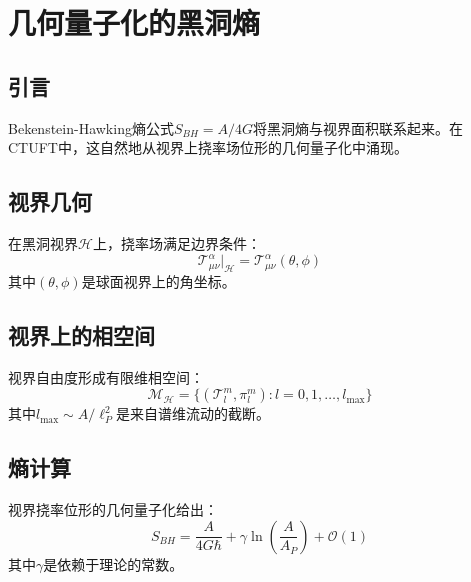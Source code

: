 \section{几何量子化的黑洞熵}
\label{sec:bh_entropy}

\subsection{引言}

Bekenstein-Hawking熵公式$S_{BH} = A/4G$将黑洞熵与视界面积联系起来。在CTUFT中，这自然地从视界上挠率场位形的几何量子化中涌现。

\subsection{视界几何}

\begin{definition}[视界上的挠率场]
在黑洞视界$\mathcal{H}$上，挠率场满足边界条件：
\begin{equation}
    \mathcal{T}^\alpha_{\mu\nu}|_{\mathcal{H}} = \mathcal{T}^\alpha_{\mu\nu}(\theta, \phi)
\end{equation}
其中$(\theta, \phi)$是球面视界上的角坐标。
\end{definition}

\subsection{视界上的相空间}

视界自由度形成有限维相空间：
\begin{equation}
    \mathcal{M}_{\mathcal{H}} = \{ (\mathcal{T}_l^m, \pi_l^m) : l = 0, 1, \ldots, l_{\max} \}
\end{equation}
其中$l_{\max} \sim A/\ell_P^2$是来自谱维流动的截断。

\subsection{熵计算}

\begin{theorem}
视界挠率位形的几何量子化给出：
\begin{equation}
    S_{BH} = \frac{A}{4G\hbar} + \gamma \ln\left(\frac{A}{A_P}\right) + \mathcal{O}(1)
\end{equation}
其中$\gamma$是依赖于理论的常数。
\end{theorem}

